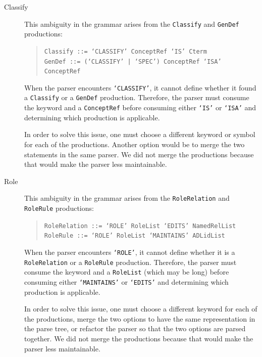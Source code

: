 \begin{description}
  \item[Classify]
    This ambiguity in the grammar arises from the \texttt{Classify} and \texttt{GenDef} productions:
    \begin{quote}
        \texttt{Classify ::= `CLASSIFY' ConceptRef `IS' Cterm}\\
        \texttt{GenDef ::= (`CLASSIFY' | `SPEC') ConceptRef `ISA' ConceptRef}
    \end{quote}
    When the parser encounters \texttt{`CLASSIFY'}, it cannot define whether it found a \texttt{Classify} or a \texttt{GenDef} production.
    Therefore, the parser must consume the keyword and a \texttt{ConceptRef} before consuming either \texttt{`IS'} or \texttt{`ISA'} and determining which production is applicable.
    
    In order to solve this issue, one must choose a different keyword or symbol for each of the productions.
    Another option would be to merge the two statements in the same parser.
    We did not merge the productions because that would make the parser less maintainable.
  
  \item[Role]
    This ambiguity in the grammar arises from the \texttt{RoleRelation} and \texttt{RoleRule} productions:
    \begin{quote}
        \texttt{RoleRelation ::= `ROLE' RoleList `EDITS' NamedRelList}\\
        \texttt{RoleRule ::= `ROLE' RoleList `MAINTAINS' ADLidList}
    \end{quote}
    When the parser encounters \texttt{`ROLE'}, it cannot define whether it is a \texttt{RoleRelation} or a \texttt{RoleRule} production.
    Therefore, the parser must consume the keyword and a \texttt{RoleList} (which may be long) before consuming either \texttt{`MAINTAINS'} or \texttt{`EDITS'} and determining which production is applicable.
    
    In order to solve this issue, one must choose a different keyword for each of the productions, merge the two options to have the same representation in the parse tree, or refactor the parser so that the two options are parsed together.
    We did not merge the productions because that would make the parser less maintainable.
  

\end{description}
